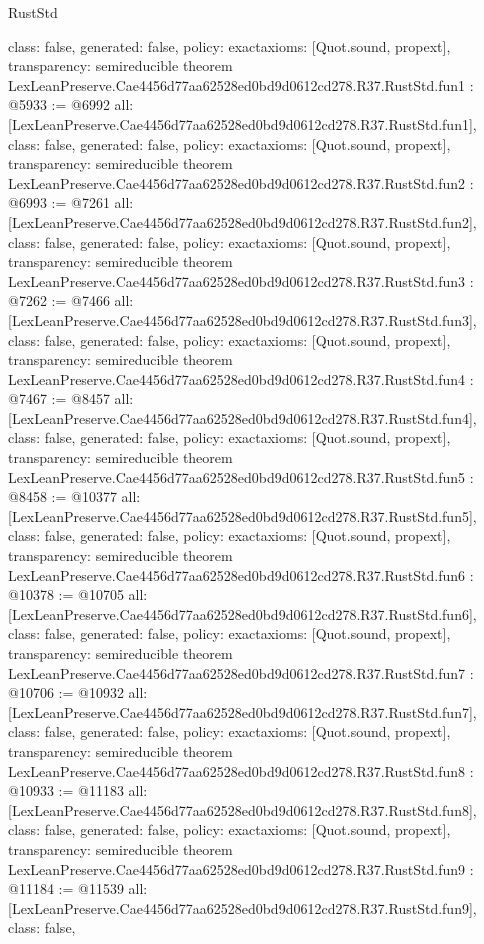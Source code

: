 \begin{lexlean}{RustStd}
\begin{coremodule}
{  class: false,
  generated: false,
  policy: exact{axioms: [Quot.sound, propext]},
  transparency: semireducible
}
theorem LexLeanPreserve.Cae4456d77aa62528ed0bd9d0612cd278.R37.RustStd.fun1 : @5933 := @6992 {
  all: [LexLeanPreserve.Cae4456d77aa62528ed0bd9d0612cd278.R37.RustStd.fun1],
  class: false,
  generated: false,
  policy: exact{axioms: [Quot.sound, propext]},
  transparency: semireducible
}
theorem LexLeanPreserve.Cae4456d77aa62528ed0bd9d0612cd278.R37.RustStd.fun2 : @6993 := @7261 {
  all: [LexLeanPreserve.Cae4456d77aa62528ed0bd9d0612cd278.R37.RustStd.fun2],
  class: false,
  generated: false,
  policy: exact{axioms: [Quot.sound, propext]},
  transparency: semireducible
}
theorem LexLeanPreserve.Cae4456d77aa62528ed0bd9d0612cd278.R37.RustStd.fun3 : @7262 := @7466 {
  all: [LexLeanPreserve.Cae4456d77aa62528ed0bd9d0612cd278.R37.RustStd.fun3],
  class: false,
  generated: false,
  policy: exact{axioms: [Quot.sound, propext]},
  transparency: semireducible
}
theorem LexLeanPreserve.Cae4456d77aa62528ed0bd9d0612cd278.R37.RustStd.fun4 : @7467 := @8457 {
  all: [LexLeanPreserve.Cae4456d77aa62528ed0bd9d0612cd278.R37.RustStd.fun4],
  class: false,
  generated: false,
  policy: exact{axioms: [Quot.sound, propext]},
  transparency: semireducible
}
theorem LexLeanPreserve.Cae4456d77aa62528ed0bd9d0612cd278.R37.RustStd.fun5 : @8458 := @10377 {
  all: [LexLeanPreserve.Cae4456d77aa62528ed0bd9d0612cd278.R37.RustStd.fun5],
  class: false,
  generated: false,
  policy: exact{axioms: [Quot.sound, propext]},
  transparency: semireducible
}
theorem LexLeanPreserve.Cae4456d77aa62528ed0bd9d0612cd278.R37.RustStd.fun6 : @10378 := @10705 {
  all: [LexLeanPreserve.Cae4456d77aa62528ed0bd9d0612cd278.R37.RustStd.fun6],
  class: false,
  generated: false,
  policy: exact{axioms: [Quot.sound, propext]},
  transparency: semireducible
}
theorem LexLeanPreserve.Cae4456d77aa62528ed0bd9d0612cd278.R37.RustStd.fun7 : @10706 := @10932 {
  all: [LexLeanPreserve.Cae4456d77aa62528ed0bd9d0612cd278.R37.RustStd.fun7],
  class: false,
  generated: false,
  policy: exact{axioms: [Quot.sound, propext]},
  transparency: semireducible
}
theorem LexLeanPreserve.Cae4456d77aa62528ed0bd9d0612cd278.R37.RustStd.fun8 : @10933 := @11183 {
  all: [LexLeanPreserve.Cae4456d77aa62528ed0bd9d0612cd278.R37.RustStd.fun8],
  class: false,
  generated: false,
  policy: exact{axioms: [Quot.sound, propext]},
  transparency: semireducible
}
theorem LexLeanPreserve.Cae4456d77aa62528ed0bd9d0612cd278.R37.RustStd.fun9 : @11184 := @11539 {
  all: [LexLeanPreserve.Cae4456d77aa62528ed0bd9d0612cd278.R37.RustStd.fun9],
  class: false,
}
\end{coremodule}
\end{lexlean}
